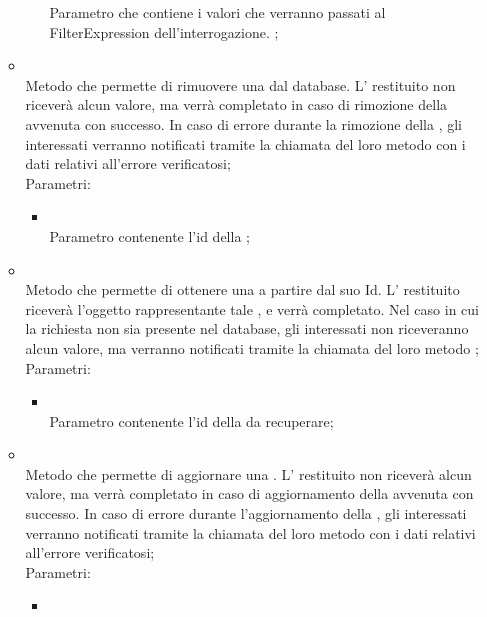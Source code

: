 \begin{itemize}
\begin{itemize}
\begin{itemize}
			Parametro che contiene i valori che verranno passati al FilterExpression dell'interrogazione.
;
		\end{itemize}
		\item[]  \\		Metodo che permette di rimuovere una  dal database. L' restituito non riceverà alcun valore, ma verrà completato in caso di rimozione della  avvenuta con successo. In caso di errore durante la rimozione della , gli  interessati verranno notificati tramite la chiamata del loro metodo  con i dati relativi all'errore verificatosi;\\
		Parametri:
		\begin{itemize}
			\item {} \\
			Parametro contenente l'id della ;
		\end{itemize}
		\item[]  \\		Metodo che permette di ottenere una  a partire dal suo Id. L' restituito riceverà l'oggetto rappresentante tale , e verrà completato. Nel caso in cui la  richiesta non sia presente nel database, gli  interessati non riceveranno alcun valore, ma verranno notificati tramite la chiamata del loro metodo ;\\
		Parametri:
		\begin{itemize}
			\item {} \\
			Parametro contenente l'id della  da recuperare;
		\end{itemize}
		\item[]  \\		Metodo che permette di aggiornare una . L' restituito non riceverà alcun valore, ma verrà completato in caso di aggiornamento della  avvenuta con successo. In caso di errore durante l'aggiornamento della , gli  interessati verranno notificati tramite la chiamata del loro metodo  con i dati relativi all'errore verificatosi;\\
		Parametri:
		\begin{itemize}
			\item {} \\

\end{itemize}
\end{itemize}
\end{itemize}
